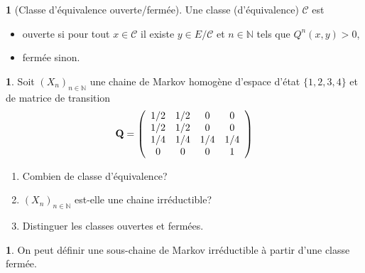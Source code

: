 \documentclass[8pt,notheorems]{beamer}
\def \N{\mathbb N}
\theoremstyle{definition}
\newtheorem{definition}{\translate{Definition}}
\theoremstyle{example}
\newtheorem{example}{\translate{Exemple}}
\newtheorem{remark}{\translate{Remarque}}
\theoremstyle{mystyle}
\theoremstyle{plain}
\begin{document}
\begin{frame}[allowframebreaks]
\begin{definition}[Classe d'équivalence ouverte/fermée]
Une classe (d'équivalence) $\mathcal{C}$ est
\begin{itemize}
\item ouverte si pour tout $x\in \mathcal{C}$ il existe $y\in E/\mathcal{C}$ et $n\in\N$ tels que $Q^{n}(x,y)>0$,
\item fermée sinon.
\end{itemize}
\end{definition}
\begin{example}
Soit $(X_n)_{n\in\N}$ une chaine de Markov homogène d'espace d'état $\{1,2,3,4\}$ et de matrice de transition
\begin{equation*}
\mathbf{Q}=
\left(\begin{array}{cccc}
$1/2$&$1/2$&$0$&$0$\\
$1/2$&$1/2$&$0$&$0$\\
$1/4$&$1/4$&$1/4$&$1/4$\\
$0$&$0$&$0$&$1$\\
\end{array}
\right)
\end{equation*}
\begin{enumerate}
\item Combien de classe d'équivalence?
\item $(X_n)_{n\in\N}$ est-elle une chaine irréductible?
\item Distinguer les classes ouvertes et fermées.
\end{enumerate}
\end{example}
\begin{remark}
On peut définir une sous-chaine de Markov irréductible à partir d'une classe fermée.
\end{remark}
\end{frame}
\end{document}
